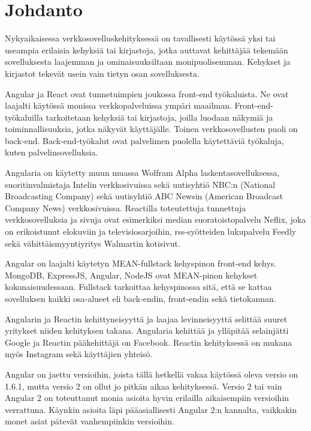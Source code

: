 \documentclass[a4paper,12pt,twoside]{article} %
\renewcommand{\baselinestretch}{1}
\begin{document}
{

\section{Johdanto}
\renewcommand{\baselinestretch}{2}

Nykyaikaisessa verkkosovelluskehityksessä on tavallisesti käytössä yksi tai useampia erilaisia kehyksiä tai kirjastoja, jotka auttavat kehittäjää tekemään sovelluksesta laajemman ja ominaisuuksiltaan monipuolisemman. Kehykset ja kirjastot tekevät usein vain tietyn osan sovelluksesta.

\vspace{4mm}\noindent Angular ja React ovat tunnetuimpien joukossa front-end työkaluista. Ne ovat laajalti käytössä monissa verkkopalveluissa ympäri maailman. Front-end-työkaluilla tarkoitetaan kehyksiä tai kirjastoja, joilla luodaan näkymiä ja toiminnallisuuksia, jotka näkyvät käyttäjälle. Toinen verkkosovellusten puoli on back-end. Back-end-työkalut ovat palvelimen puolella käytettäviä työkaluja, kuten palvelinsovelluksia.

\vspace{4mm}\noindent Angularia on käytetty muun muassa Wolfram Alpha laskentasovelluksessa\cite{angularlist}, suoritinvalmistaja Intelin verkkosivuissa sekä uutisyhtiö NBC:n (National Broadcasting Company) sekä uutisyhtiö ABC Newsin (American Broadcast Company News) verkkosivuissa.\cite{angularwikipedia} Reactilla toteutettuja tunnettuja verkkosovelluksia ja sivuja ovat esimerkiksi median suoratoistopalvelu Neflix, joka on erikoistunut elokuviin ja televisiosarjoihin, rss-syötteiden lukupalvelu Feedly sekä vähittäismyyntiyritys Walmartin kotisivut. \cite{reactlist}

\vspace{4mm}\noindent Angular on laajalti käytetyn MEAN-fullstack kehyspinon front-end kehys. MongoDB, ExpressJS, Angular, NodeJS ovat MEAN-pinon kehykset kokonaisuudessaan. Fullstack tarkoittaa kehyspinossa sitä, että se kattaa sovelluksen kaikki osa-alueet eli back-endin, front-endin sekä tietokannan.

\vspace{4mm}\noindent
Angularin ja Reactin kehittyneisyyttä ja laajaa levinneisyyttä selittää suuret yritykset niiden kehityksen takana. Angularia kehittää ja ylläpitää selainjätti Google ja Reactin pääkehittäjä on Facebook. Reactin kehityksessä on mukana myös Instagram sekä käyttäjien yhteisö.

\vspace{4mm}\noindent Angular on jaettu versioihin, joista tällä hetkellä vakaa käytössä oleva versio on 1.6.1, mutta versio 2 on ollut jo pitkän aikaa kehityksessä. Versio 2 tai vain Angular 2 on toteuttanut monia asioita hyvin erilailla aikaisempiin versioihin verrattuna. Käynkin asioita läpi pääasiallisesti Angular 2:n kannalta, vaikkakin monet asiat pätevät vanhempiinkin versioihin.

}
\end{document}
